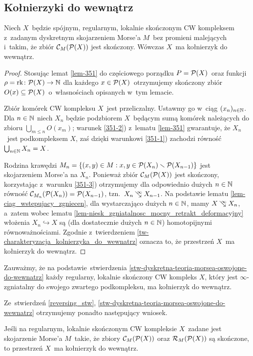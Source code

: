 \subsection{Kołnierzyki do wewnątrz}
\begin{stw}\label{stw-dyskretna-teoria-morsea-oswojone-do-wewnatrz}
Niech $X$~będzie spójnym, regularnym, lokalnie skończonym CW kompleksem z~zadanym dyskretnym skojarzeniem Morse'a $M$~bez promieni malejących i~takim, że zbiór $\mathcal{C}_M(\mathcal{P}(X))$ jest skończony. Wówczas $X$~ma kołnierzyk do wewnątrz.
\end{stw}
\begin{proof}
Stosując lemat \ref{lem-351} do częściowego porządku $P=\mathcal{P}(X)$~oraz funkcji $\rho=\operatorname{rk}\colon \mathcal{P}(X)\to \mathbb{N}$ dla każdego $x\in\mathcal{P}(X)$~otrzymujemy skończony zbiór $O(x)\subseteq \mathcal{P}(X)$~o~własnościach opisanych w~tym lemacie.

Zbiór komórek CW kompleksu $X$~jest przeliczalny. Ustawmy go w~ciąg $(x_n)_{n\in\mathbb{N}}$. Dla $n\in\mathbb{N}$ niech $X_n$ będzie podzbiorem $X$~będącym sumą komórek należących do zbioru $\bigcup_{m\leq n} O(x_m)$; warunek \ref{351-2}) z~lematu \ref{lem-351} gwarantuje, że $X_n$~jest podkompleksem $X$, zaś dzięki warunkowi \ref{351-1}) zachodzi równość $\bigcup_{n\in\mathbb{N}} X_n=X$.

Rodzina krawędzi $M_n=\{(x,y)\in M: x,y\in \mathcal{P}(X_n)\smallsetminus \mathcal{P}(X_{n-1})\}$ jest skojarzeniem Morse'a na $X_n$. Ponieważ zbiór $\mathcal{C}_M(\mathcal{P}(X))$ jest skończony, korzystając z~warunku \ref{351-3}) otrzymujemy dla odpowiednio dużych $n\in\mathbb{N}$ równość $\mathcal{C}_{M_n}(\mathcal{P}(X_n))=\mathcal{P}(X_{n-1})$, tzn.~$X_n\infcoll X_{n-1}$. Na podstawie lematu \ref{lem-ciag_wstepujacy_zgniecen}, dla wystarczająco dużych $n\in\mathbb{N}$, mamy $X\infcoll X_n$, a~zatem wobec lematu \ref{lem-niesk_zgniatalnosc_mocny_retrakt_deformacyjny} włożenia $X_n\hookrightarrow X$ są (dla dostatecznie dużych $n\in\mathbb{N}$) homotopijnymi równoważnościami. Zgodnie z~twierdzeniem \ref{tw-charakteryzacja_kolnierzyka_do_wewnatrz} oznacza to, że przestrzeń $X$~ma kołnierzyk do wewnątrz.
\end{proof}

Zauważmy, że na podstawie~stwierdzenia \ref{stw-dyskretna-teoria-morsea-oswojone-do-wewnatrz} każdy regularny, lokalnie skończony CW kompleks $X$, który jest $\infty$-zgniatalny do swojego zwartego podkompleksu, ma kołnierzyk do wewnątrz.

Ze~stwierdzeń \ref{reversing_stw}, \ref{stw-dyskretna-teoria-morsea-oswojone-do-wewnatrz} otrzymujemy ponadto następujący wniosek.
\begin{wn}
Jeśli na regularnym, lokalnie skończonym CW kompleksie $X$~zadane jest skojarzenie Morse'a $M$~takie, że zbiory $\mathcal{C}_M(\mathcal{P}(X))$ oraz $\mathcal{R}_M(\mathcal{P}(X))$ są skończone, to przestrzeń $X$~ma kołnierzyk do wewnątrz.
\end{wn}

